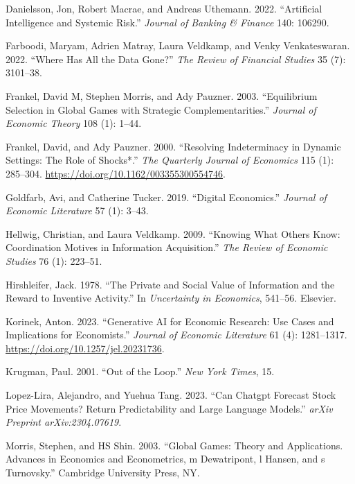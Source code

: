 \documentclass[
]{article}
\newlength{\cslhangindent}
\newenvironment{CSLReferences}[2] %
 {\begin{list}{}{%
  \setlength{\itemindent}{0pt}
  \setlength{\leftmargin}{0pt}
  \setlength{\parsep}{0pt}
  \ifodd #1
   \setlength{\leftmargin}{\cslhangindent}
   \setlength{\itemindent}{-1\cslhangindent}
  \fi
  \setlength{\itemsep}{#2\baselineskip}}}
 {\end{list}}
\theoremstyle{plain}
\theoremstyle{remark}
\begin{document}
\begin{CSLReferences}{1}{0}
Danielsson, Jon, Robert Macrae, and Andreas Uthemann. 2022.
{``Artificial Intelligence and Systemic Risk.''} \emph{Journal of
Banking \& Finance} 140: 106290.

Farboodi, Maryam, Adrien Matray, Laura Veldkamp, and Venky
Venkateswaran. 2022. {``Where Has All the Data Gone?''} \emph{The Review
of Financial Studies} 35 (7): 3101--38.

Frankel, David M, Stephen Morris, and Ady Pauzner. 2003. {``Equilibrium
Selection in Global Games with Strategic Complementarities.''}
\emph{Journal of Economic Theory} 108 (1): 1--44.

Frankel, David, and Ady Pauzner. 2000. {``{Resolving Indeterminacy in
Dynamic Settings: The Role of Shocks*}.''} \emph{The Quarterly Journal
of Economics} 115 (1): 285--304.
\url{https://doi.org/10.1162/003355300554746}.

Goldfarb, Avi, and Catherine Tucker. 2019. {``Digital Economics.''}
\emph{Journal of Economic Literature} 57 (1): 3--43.

Hellwig, Christian, and Laura Veldkamp. 2009. {``Knowing What Others
Know: Coordination Motives in Information Acquisition.''} \emph{The
Review of Economic Studies} 76 (1): 223--51.

Hirshleifer, Jack. 1978. {``The Private and Social Value of Information
and the Reward to Inventive Activity.''} In \emph{Uncertainty in
Economics}, 541--56. Elsevier.

Korinek, Anton. 2023. {``Generative AI for Economic Research: Use Cases
and Implications for Economists.''} \emph{Journal of Economic
Literature} 61 (4): 1281--1317.
\url{https://doi.org/10.1257/jel.20231736}.

Krugman, Paul. 2001. {``Out of the Loop.''} \emph{New York Times}, 15.

Lopez-Lira, Alejandro, and Yuehua Tang. 2023. {``Can Chatgpt Forecast
Stock Price Movements? Return Predictability and Large Language
Models.''} \emph{arXiv Preprint arXiv:2304.07619}.

Morris, Stephen, and HS Shin. 2003. {``Global Games: Theory and
Applications. Advances in Economics and Econometrics, m Dewatripont, l
Hansen, and s Turnovsky.''} Cambridge University Press, NY.


\end{CSLReferences}
\end{document}
